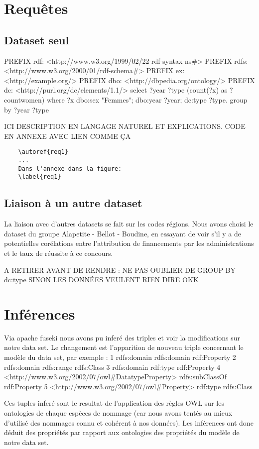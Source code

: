 \chapter{Requêtes}
\section{Dataset seul}

PREFIX rdf: <http://www.w3.org/1999/02/22-rdf-syntax-ns#>
PREFIX rdfs: <http://www.w3.org/2000/01/rdf-schema#>
PREFIX ex: <http://example.org/>
PREFIX dbo:  <http://dbpedia.org/ontology/>
PREFIX dc:  <http://purl.org/dc/elements/1.1/>
select ?year ?type (count(?x) as ?countwomen)
where {
    ?x dbo:sex "Femmes";
        dbo:year ?year;
        dc:type ?type.
}
group by ?year ?type

ICI DESCRIPTION EN LANGAGE NATUREL ET EXPLICATIONS. CODE EN ANNEXE AVEC LIEN COMME ÇA
\begin{verbatim}
    \autoref{req1}
    ...
    Dans l'annexe dans la figure:
    \label{req1}
\end{verbatim}

\section{Liaison à un autre dataset}

La liaison avec d'autres datasets se fait sur les codes régions. Nous avons choisi le dataset du groupe Alapetite - Bellot - Boudine, en essayant de voir s'il y a de potentielles corélations entre l'attribution de financements par les administrations et le taux de réussite à ce concours.

A RETIRER AVANT DE RENDRE : NE PAS OUBLIER DE GROUP BY dc:type SINON LES DONNÉES VEULENT RIEN DIRE OKK

\chapter{Inférences}

Via apache fuseki nous avons pu inferé des triples et voir la modifications sur notre data set. Le changement est l'apparition de nouveau triple concernant le modèle du data set, par exemple :
1	rdfs:domain rdfs:domain rdf:Property
2	rdfs:domain rdfs:range  rdfs:Class
3	rdfs:domain rdf:type    rdf:Property
4	<http://www.w3.org/2002/07/owl#DatatypeProperty>  rdfs:subClassOf rdf:Property
5	<http://www.w3.org/2002/07/owl#Property>  rdf:type  rdfs:Class

Ces tuples inferé sont le resultat de l'application des règles OWL sur les ontologies de chaque espèces de nommage (car nous avons tentés au mieux d'utilisé des nommages connu et cohérent à nos données).
Les inférences ont donc déduit des propriétés par rapport aux ontologies des propriétés du modèle de notre data set.

